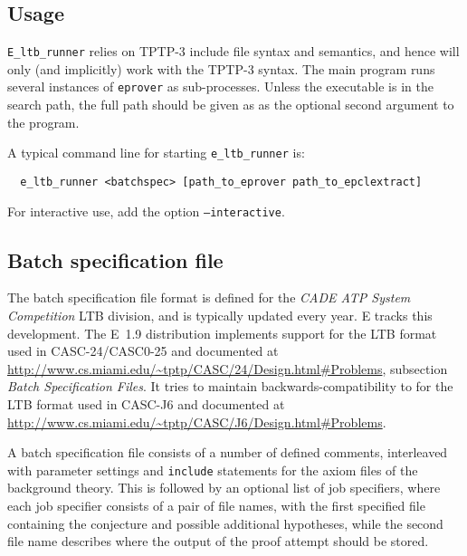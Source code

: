 \documentclass{report}
\begin{document}
\subsection{Usage}

\texttt{E\_ltb\_runner} relies on TPTP-3 include file syntax and
semantics, and hence will only (and implicitly) work with the TPTP-3
syntax. The main program runs several instances of \texttt{eprover} as
sub-processes. Unless the executable is in the search path, the full
path should be given as as the optional second argument to the
program.


A typical command line for starting \texttt{e\_ltb\_runner} is:

\begin{verbatim}
  e_ltb_runner <batchspec> [path_to_eprover path_to_epclextract]
\end{verbatim}

For interactive use, add the option \texttt{--interactive}.


\subsection{Batch specification file}
\label{sec:bsf}

The batch specification file format is defined for the \emph{CADE ATP
  System Competition} LTB division, and is typically updated every
year. E tracks this development. The E~1.9 distribution implements
support for the LTB format used in CASC-24/CASC0-25 and documented at
\url{http://www.cs.miami.edu/~tptp/CASC/24/Design.html#Problems},
subsection \emph{Batch Specification Files}. It tries to maintain
backwards-compatibility to for the LTB format used in CASC-J6 and
documented at
\url{http://www.cs.miami.edu/~tptp/CASC/J6/Design.html#Problems}.

A batch specification file consists of a number of defined comments,
interleaved with parameter settings and \texttt{include} statements
for the axiom files of the background theory. This is followed by an
optional list of job specifiers, where each job specifier consists of
a pair of file names, with the first specified file containing the
conjecture and possible additional hypotheses, while the second file
name describes where the output of the proof attempt should be stored.
\end{document}
